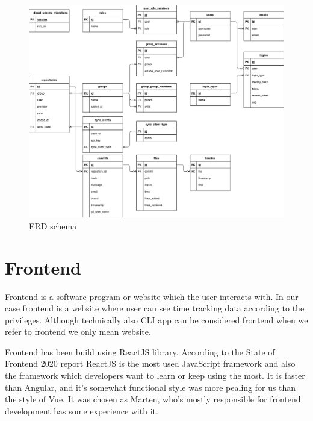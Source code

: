 \begin{figure}[H]
    \includegraphics[width=\textwidth]{figures/erd_schema}
    \caption{ERD schema}
    \label{fig:erd-schema}
\end{figure}

\section{Frontend}\label{sec:frontend}
Frontend is a software program or website which the user interacts with.
In our case frontend is a website where user can see time tracking data according to the privileges.
Although technically also CLI app can be considered frontend when we refer to frontend we only mean website.

Frontend has been build using ReactJS library.
According to the State of Frontend 2020 report ReactJS is the most used JavaScript framework and also the framework which developers want to learn or keep using the most.
It is faster than Angular, and it's somewhat functional style was more pealing for us than the style of Vue.
It was chosen as Marten, who's mostly responsible for frontend development has some experience with it.

